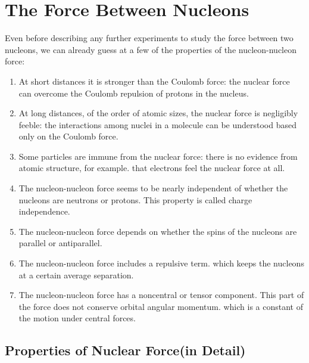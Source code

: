 \chapter{The Force Between Nucleons}
Even before describing any further experiments to study the force between two nucleons, we can already guess at a few of the properties of the nucleon-nucleon force:\\
\begin{enumerate}
	\item At short distances it is stronger than the Coulomb force: the nuclear force can overcome the Coulomb repulsion of protons in the nucleus.
	\item At long distances, of the order of atomic sizes, the nuclear force is negligibly feeble: the interactions among nuclei in a molecule can be understood based only on the Coulomb force.
	\item Some particles are immune from the nuclear force: there is no evidence from atomic structure, for example. that electrons feel the nuclear force at all.
	\item The nucleon-nucleon force seems to be nearly independent of whether the nucleons are neutrons or protons. This property is called charge independence.
	\item The nucleon-nucleon force depends on whether the spins of the nucleons are parallel or antiparallel.
	\item The nucleon-nucleon force includes a repulsive term. which keeps the nucleons at a certain average separation.
	\item The nucleon-nucleon force has a noncentral or tensor component. This part of the force does not conserve orbital angular momentum. which is a constant of the motion under central forces.
\end{enumerate}
\section{Properties of Nuclear Force(in Detail)}
